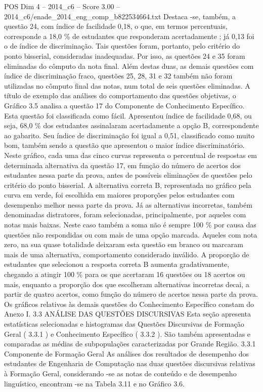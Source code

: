 \begin{textsample}{POS Dim 4 – 2014\_c6 – Score 3.00 – 2014\_c6/enade\_2014\_eng\_comp\_b822534664.txt}
Destaca -se, também, a questão 24, com índice de facilidade 0,18, o que, em termos percentuais, corresponde a 18,0 \% de estudantes que responderam acertadamente ; já 0,13 foi o de índice de discriminação.
Tais questões foram, portanto, pelo critério do ponto bisserial, consideradas inadequadas.
Por isso, as questões 24 e 35 foram eliminadas do cômputo da nota final.
Além destas duas, as demais questões com índice de discriminação fraco, questões 25, 28, 31 e 32 também não foram utilizadas no cômputo final das notas, num total de seis questões eliminadas.
A título de exemplo das análises do comportamento das questões objetivas, o Gráfico 3.5 analisa a questão 17 do Componente de Conhecimento Específico.
Esta questão foi classificada como fácil.
Apresentou índice de facilidade 0,68, ou seja, 68,0 \% dos estudantes assinalaram acertadamente a opção B, correspondente ao gabarito.
Seu índice de discriminação foi igual a 0,51, classificado como muito bom, também sendo a questão que apresentou o maior índice discriminatório.
Neste gráfico, cada uma das cinco curvas representa o percentual de respostas em determinada alternativa da questão 17, em função do número de acertos dos estudantes nessa parte da prova, antes de possíveis eliminações de questões pelo critério do ponto bisserial.
A alternativa correta B, representada no gráfico pela curva em verde, foi escolhida em maiores proporções pelos estudantes com desempenho melhor nessa parte da prova.
Já as alternativas incorretas, também denominadas distratores, foram selecionadas, principalmente, por aqueles com notas mais baixas.
Neste caso também a soma não é sempre 100 \% por causa das questões não respondidas ou com mais de uma opção marcada.
Aqueles com nota zero, na sua quase totalidade deixaram esta questão em branco ou marcaram mais de uma alternativa, comportamento considerado inválido.
A proporção de estudantes que selecionou a resposta correta B aumenta gradativamente, chegando a atingir 100 \% para os que acertaram 16 questões ou 18 acertos ou mais, enquanto a proporção dos que escolheram alternativas incorretas decai, a partir de quatro acertos, como função do número de acertos nessa parte da prova.
Os gráficos relativos às demais questões do Conhecimento Específico constam do Anexo I. 3.3 ANÁLISE DAS QUESTÕES DISCURSIVAS Esta seção apresenta estatísticas selecionadas e histogramas das Questões Discursivas de Formação Geral ( 3.3.1 ) e Conhecimento Específico ( 3.3.2 ).
São também apresentadas e comparadas as médias de subpopulações caracterizadas por Grande Região. 3.3.1 Componente de Formação Geral As análises dos resultados de desempenho dos estudantes de Engenharia de Computação nas duas questões discursivas relativas à Formação Geral, considerando -se as notas de conteúdo e de desempenho linguístico, encontram -se na Tabela 3.11 e no Gráfico 3.6.

\end{textsample}
